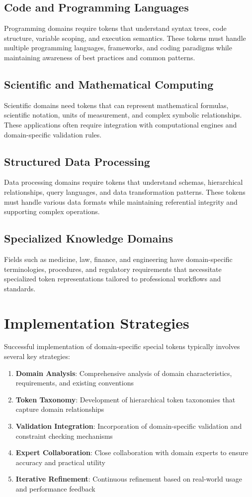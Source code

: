 \subsection{Code and Programming Languages}
Programming domains require tokens that understand syntax trees, code structure, variable scoping, and execution semantics. These tokens must handle multiple programming languages, frameworks, and coding paradigms while maintaining awareness of best practices and common patterns.

\subsection{Scientific and Mathematical Computing}
Scientific domains need tokens that can represent mathematical formulas, scientific notation, units of measurement, and complex symbolic relationships. These applications often require integration with computational engines and domain-specific validation rules.

\subsection{Structured Data Processing}
Data processing domains require tokens that understand schemas, hierarchical relationships, query languages, and data transformation patterns. These tokens must handle various data formats while maintaining referential integrity and supporting complex operations.

\subsection{Specialized Knowledge Domains}
Fields such as medicine, law, finance, and engineering have domain-specific terminologies, procedures, and regulatory requirements that necessitate specialized token representations tailored to professional workflows and standards.

\section{Implementation Strategies}

Successful implementation of domain-specific special tokens typically involves several key strategies:

\begin{enumerate}
\item \textbf{Domain Analysis}: Comprehensive analysis of domain characteristics, requirements, and existing conventions
\item \textbf{Token Taxonomy}: Development of hierarchical token taxonomies that capture domain relationships
\item \textbf{Validation Integration}: Incorporation of domain-specific validation and constraint checking mechanisms
\item \textbf{Expert Collaboration}: Close collaboration with domain experts to ensure accuracy and practical utility
\item \textbf{Iterative Refinement}: Continuous refinement based on real-world usage and performance feedback
\end{enumerate}

